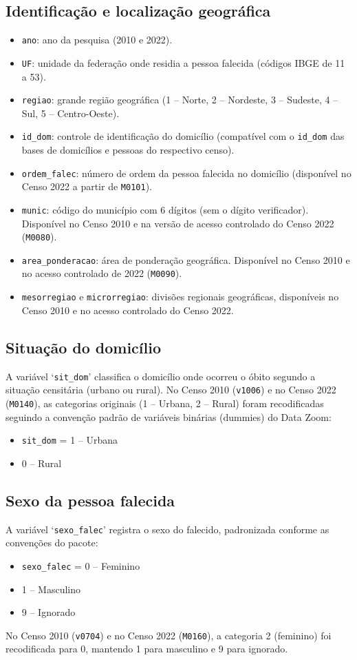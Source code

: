 \documentclass[12pt,a4paper]{article}
\newcommand{\vr}[1]{\texttt{#1}}
\begin{document}
\subsection{Identificação e localização geográfica}
\begin{itemize}
  \item \vr{ano}: ano da pesquisa (2010 e 2022).
  \item \vr{UF}: unidade da federação onde residia a pessoa falecida (códigos IBGE de 11 a 53).
  \item \vr{regiao}: grande região geográfica (1 -- Norte, 2 -- Nordeste, 3 -- Sudeste, 4 -- Sul, 5 -- Centro-Oeste).
  \item \vr{id\_dom}: controle de identificação do domicílio (compatível com o \vr{id\_dom} das bases de domicílios e pessoas do respectivo censo).
  \item \vr{ordem\_falec}: número de ordem da pessoa falecida no domicílio (disponível no Censo 2022 a partir de \vr{M0101}).
  \item \vr{munic}: código do município com 6 dígitos (sem o dígito verificador). Disponível no Censo 2010 e na versão de acesso controlado do Censo 2022 (\vr{M0080}).
  \item \vr{area\_ponderacao}: área de ponderação geográfica. Disponível no Censo 2010 e no acesso controlado de 2022 (\vr{M0090}).
  \item \vr{mesorregiao} e \vr{microrregiao}: divisões regionais geográficas, disponíveis no Censo 2010 e no acesso controlado do Censo 2022.
\end{itemize}

\subsection{Situação do domicílio}
A variável ‘\vr{sit\_dom}’ classifica o domicílio onde ocorreu o óbito segundo a situação censitária (urbano ou rural). No Censo 2010 (\vr{v1006}) e no Censo 2022 (\vr{M0140}), as categorias originais (1 -- Urbana, 2 -- Rural) foram recodificadas seguindo a convenção padrão de variáveis binárias (dummies) do Data Zoom:
\begin{itemize}
  \item \vr{sit\_dom} = 1 -- Urbana
  \item 0 -- Rural
\end{itemize}

\subsection{Sexo da pessoa falecida}
A variável ‘\vr{sexo\_falec}’ registra o sexo do falecido, padronizada conforme as convenções do pacote:
\begin{itemize}
  \item \vr{sexo\_falec} = 0 -- Feminino
  \item 1 -- Masculino
  \item 9 -- Ignorado
\end{itemize}
No Censo 2010 (\vr{v0704}) e no Censo 2022 (\vr{M0160}), a categoria 2 (feminino) foi recodificada para 0, mantendo 1 para masculino e 9 para ignorado.
\end{document}
